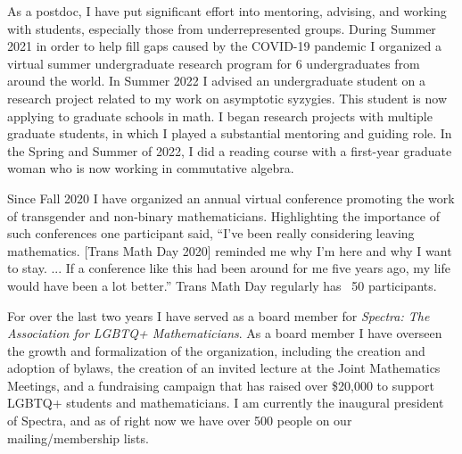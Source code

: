 \documentclass[11pt,reqno]{amsart}
\theoremstyle{remark}
\begin{document}
As a postdoc, I have put significant effort into mentoring, advising, and working with students, especially those from underrepresented groups. During Summer 2021 in order to help fill gaps caused by the COVID-19 pandemic I organized a virtual summer undergraduate research program for 6 undergraduates from around the world. In Summer 2022 I advised an undergraduate student on a research project related to my work on asymptotic syzygies. This student is now applying to graduate schools in math. I began research projects with multiple graduate students, in which I played a substantial mentoring and guiding role. In the Spring and Summer of 2022, I did a reading course with a first-year graduate woman who is now working in commutative algebra.


Since Fall 2020 I have organized an annual virtual conference promoting the work of transgender and non-binary mathematicians. Highlighting the importance of such conferences one participant said, ``I've been really considering leaving mathematics.  [Trans Math Day 2020] reminded me why I'm here and why I want to stay. ... If a conference like this had been around for me five years ago, my life would have been a lot better.'' Trans Math Day regularly has ~50 participants. %

For over the last two years I have served as a board member for \textit{Spectra: The Association for LGBTQ+ Mathematicians}. As a board member I have overseen the growth and formalization of the organization, including the creation and adoption of bylaws, the creation of an invited lecture at the Joint Mathematics Meetings, and a fundraising campaign that has raised over \$20,000 to support LGBTQ+ students and mathematicians. I am currently the inaugural president of Spectra, and as of right now we have over 500 people on our mailing/membership lists.  
\end{document}

